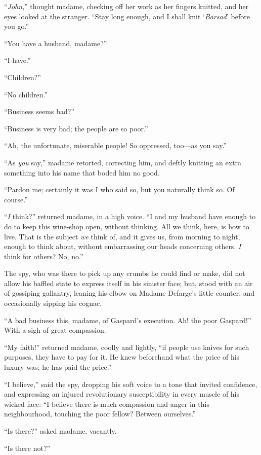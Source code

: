 ``\emph{John},'' thought madame, checking off her work as her fingers knitted,
and her eyes looked at the stranger.  ``Stay long enough, and I shall
knit `\emph{Barsad}' before you go.''

``You have a husband, madame?''

``I have.''

``Children?''

``No children.''

``Business seems bad?''

``Business is very bad; the people are so poor.''

``Ah, the unfortunate, miserable people!  So oppressed, too---as you say.''

``As \emph{you} say,'' madame retorted, correcting him, and deftly knitting
an extra something into his name that boded him no good.

``Pardon me; certainly it was I who said so, but you naturally think so.
Of course.''

``\emph{I} think?'' returned madame, in a high voice.  ``I and my husband
have enough to do to keep this wine-shop open, without thinking.  All
we think, here, is how to live.  That is the subject \emph{we} think of,
and it gives us, from morning to night, enough to think about, without
embarrassing our heads concerning others.  \emph{I} think for others?  No, no.''

The spy, who was there to pick up any crumbs he could find or make, did
not allow his baffled state to express itself in his sinister face; but,
stood with an air of gossiping gallantry, leaning his elbow on Madame
Defarge's little counter, and occasionally sipping his cognac.

``A bad business this, madame, of Gaspard's execution.  Ah! the poor
Gaspard!''  With a sigh of great compassion.

``My faith!'' returned madame, coolly and lightly, ``if people use knives
for such purposes, they have to pay for it.  He knew beforehand what
the price of his luxury was; he has paid the price.''

``I believe,'' said the spy, dropping his soft voice to a tone that
invited confidence, and expressing an injured revolutionary
susceptibility in every muscle of his wicked face:  ``I believe there
is much compassion and anger in this neighbourhood, touching the
poor fellow?  Between ourselves.''

``Is there?'' asked madame, vacantly.

``Is there not?''

